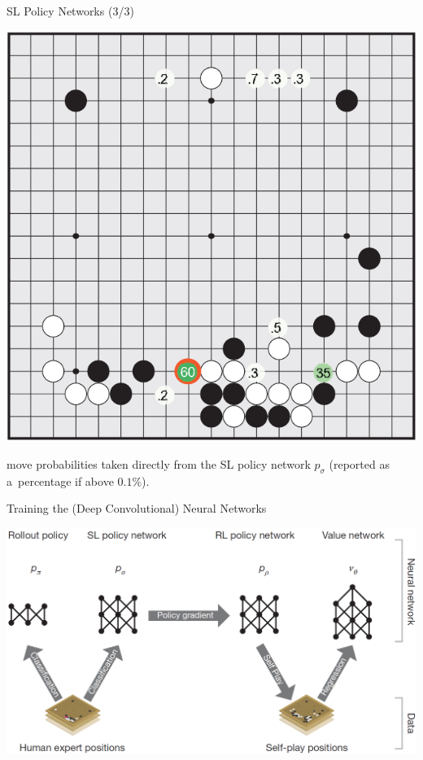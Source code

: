 \documentclass{beamer}
\begin{document}
{    \begin{frame}{SL Policy Networks (3/3)}
      \begin{center}
        \includegraphics[height=.8\textheight]{../img/eval_SL_policy_network.png}

        \tiny
        move probabilities taken directly from the SL policy network $p_\sigma$ (reported as a~percentage if above $0.1\%$).
      \end{center}
    \end{frame}

    \begin{frame}{Training the (Deep Convolutional) Neural Networks}
      \begin{center}
        \includegraphics[width=\textwidth]{../img/neural_nets_pipeline.png}
      \end{center}
    \end{frame}

}
\end{document}
